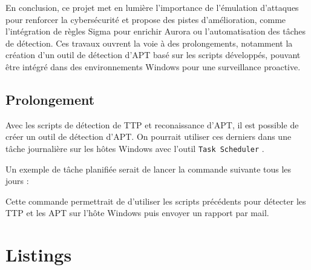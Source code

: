 \documentclass[12pt,letterpaper]{article}
\begin{document}
\bigskip

En conclusion, ce projet met en lumière l'importance de l'émulation d'attaques pour renforcer la cybersécurité et propose des pistes d'amélioration, comme l'intégration de règles Sigma pour enrichir Aurora ou l'automatisation des tâches de détection.
Ces travaux ouvrent la voie à des prolongements, notamment la création d'un outil de détection d'APT basé sur les scripts développés, pouvant être intégré dans des environnements Windows pour une surveillance proactive.

\subsection{Prolongement}

Avec les scripts de détection de TTP et reconaissance d'APT, il est possible de créer un outil de détection d'APT.
On pourrait utiliser ces derniers dans une tâche journalière sur les hôtes Windows avec l'outil \verb|Task Scheduler| \cite{mensHowCreatePowerShell2023}.

Un exemple de tâche planifiée serait de lancer la commande suivante tous les jours :


Cette commande permettrait de d'utiliser les scripts précédents pour détecter les TTP et les APT sur l'hôte Windows puis envoyer un rapport par mail.

\newpage
\section{Listings}




\newpage

\end{document}
